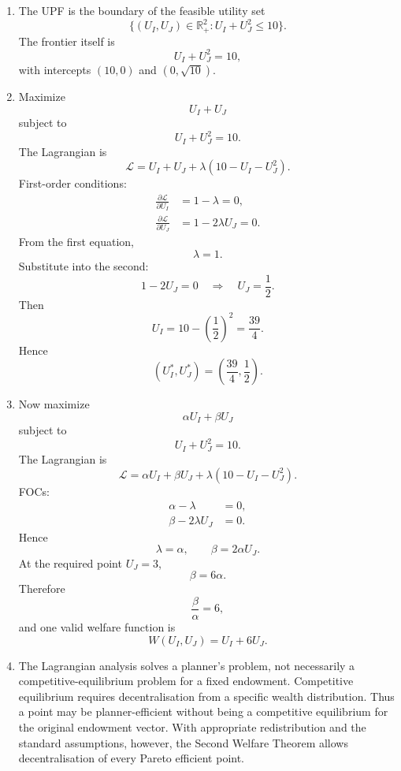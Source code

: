 \documentclass[12pt]{article}
\newcommand{\R}{\mathbb{R}}
\begin{document}
\begin{enumerate}[label=(\alph*)]
    \item
    The UPF is the boundary of the feasible utility set
    \[
    \{(U_I,U_J)\in \R_+^2: U_I+U_J^2\le 10\}.
    \]
    The frontier itself is
    \[
    U_I+U_J^2=10,
    \]
    with intercepts \((10,0)\) and \((0,\sqrt{10})\).

    \item
    Maximize
    \[
    U_I+U_J
    \]
    subject to
    \[
    U_I+U_J^2=10.
    \]
    The Lagrangian is
    \[
    \mathcal L = U_I+U_J+\lambda(10-U_I-U_J^2).
    \]
    First-order conditions:
    \begin{align*}
        \frac{\partial \mathcal L}{\partial U_I} &= 1-\lambda=0,\\
        \frac{\partial \mathcal L}{\partial U_J} &= 1-2\lambda U_J=0.
    \end{align*}
    From the first equation,
    \[
    \lambda=1.
    \]
    Substitute into the second:
    \[
    1-2U_J=0
    \quad\Longrightarrow\quad
    U_J=\frac12.
    \]
    Then
    \[
    U_I=10-\left(\frac12\right)^2=\frac{39}{4}.
    \]
    Hence
    \[
    \boxed{\left(U_I^*,U_J^*\right)=\left(\frac{39}{4},\frac12\right).}
    \]
\newpage
    \item
    Now maximize
    \[
    \alpha U_I+\beta U_J
    \]
    subject to
    \[
    U_I+U_J^2=10.
    \]
    The Lagrangian is
    \[
    \mathcal L = \alpha U_I+\beta U_J+\lambda(10-U_I-U_J^2).
    \]
    FOCs:
    \begin{align*}
        \alpha-\lambda &=0,\\
        \beta-2\lambda U_J &=0.
    \end{align*}
    Hence
    \[
    \lambda=\alpha,
    \qquad
    \beta=2\alpha U_J.
    \]
    At the required point \(U_J=3\),
    \[
    \beta=6\alpha.
    \]
    Therefore
    \[
    \boxed{\frac{\beta}{\alpha}=6,}
    \]
    and one valid welfare function is
    \[
    \boxed{W(U_I,U_J)=U_I+6U_J.}
    \]

    \item
    The Lagrangian analysis solves a planner's problem, not necessarily a competitive-equilibrium problem for a fixed endowment. Competitive equilibrium requires decentralisation from a specific wealth distribution. Thus a point may be planner-efficient without being a competitive equilibrium for the original endowment vector. With appropriate redistribution and the standard assumptions, however, the Second Welfare Theorem allows decentralisation of every Pareto efficient point.
\end{enumerate}
\end{document}
